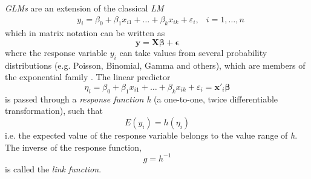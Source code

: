 \textit{\acp{GLM}} are an extension of the classical \textit{\ac{LM}}
$$
\begin{aligned}
&y_{i}=\beta_{0}+\beta_{1} x_{i 1}+\ldots+\beta_{k} x_{i k}+\varepsilon_{i}, &i=1, \ldots, n
\end{aligned}
$$
which in matrix notation can be written as
$$ \bm{y} = \bm{X}\bm{\beta} + \bm{\epsilon} $$
where the response variable $y_i$ can take values from several probability distributions (e.g. Poisson, Binomial, Gamma and others), which are members of the exponential family \citep{fahrmeir2003regression}. The linear predictor 
\begin{equation} 
\eta_i = \beta_{0}+\beta_{1} x_{i 1}+\ldots+\beta_{k} x_{i k}+\varepsilon_{i} = \bm{x'}_i \bm{\beta}
\label{eq:linear_predictor_glm}
\end{equation}
is passed through a \textit{response function h} (a one-to-one, twice differentiable transformation), such that
$$ E(y_i) = h(\eta_i)$$
i.e. the expected value of the response variable belongs to the value range of \textit{h}. The inverse of the response function, 
$$g = h^{-1}$$ is called the \textit{link function}.




